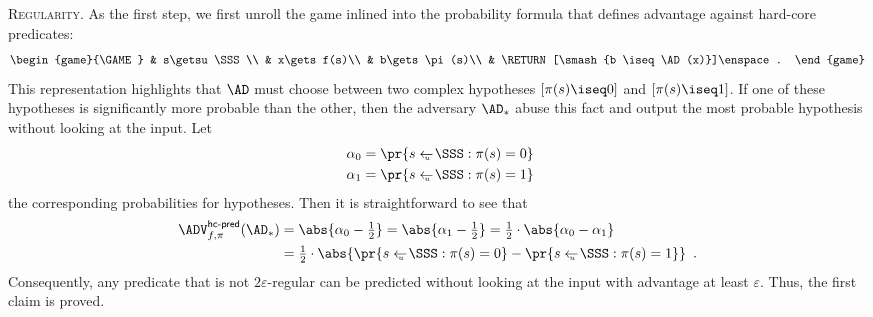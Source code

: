 \documentclass{crypto-exercise}
\begin{document}
\begin{solution}
\textsc{Regularity.}
As the first step,  we first unroll the game inlined into the probability formula that defines advantage against hard-core predicates:
\begin{align*}
\begin{game}{\GAME}
 & s\getsu \SSS\\
 & x\gets f(s)\\
 & b\gets \pi(s)\\
 & \RETURN [\smash{b \iseq \AD(x)}]\enspace.
\end{game}
\end{align*} 
This representation highlights that  $\AD$ must choose between two complex hypotheses $[\pi(s)\iseq 0]$ and $[\pi(s)\iseq 1]$. If one of these hypotheses is significantly more probable than the other, then the adversary $\AD_*$ abuse this fact and output the most probable hypothesis without looking at the input. Let 
\begin{align*}
\alpha_0&=\pr{s\getsu\SSS:\pi(s)=0}\\\
\alpha_1&=\pr{s\getsu\SSS:\pi(s)=1}
\end{align*}  
the corresponding probabilities for hypotheses. Then it is straightforward to see that
\begin{align*}
\advHCPredXX{f,\pi}{\AD_*}&=\abs{\alpha_0-{\textstyle\frac{1}{2}}}= \abs{\alpha_1-{\textstyle\frac{1}{2}}}={\textstyle \frac{1}{2}}\cdot \abs{\alpha_0-\alpha_1}\\
&={\textstyle \frac{1}{2}}\cdot \abs{\pr{s\getsu\SSS:\pi(s)=0}-\pr{s\getsu\SSS:\pi(s)=1}}\enspace.
\end{align*}
Consequently, any predicate that is not $2\varepsilon$-regular can be predicted without looking at the input with advantage at least $\varepsilon$. Thus, the first claim is proved.   


\end{solution}
\end{document}
